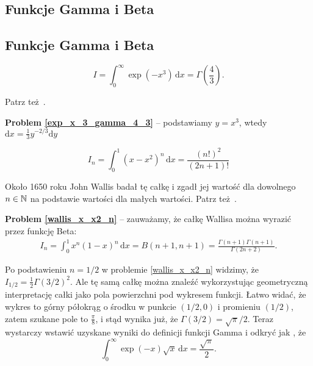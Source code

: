 \subsection{Funkcje Gamma i Beta}
\subsection{Funkcje Gamma i Beta}
\begin{problem}
\label{exp_x_3_gamma_4_3}%
    \begin{equation}
        I = \int_{0}^\infty \exp \left( -x^3 \right) \,\mathrm{d} x = \Gamma \left( \frac 4 3 \right).
    \end{equation}
\end{problem}

Patrz też \cite[s. 119]{nahin15}.

\textbf{Problem \ref{exp_x_3_gamma_4_3}} -- podstawiamy $y = x^3$, wtedy $\mathrm{d}x = \frac 1 3 y^{-2/3} \mathrm{d}y$

\begin{problem}
\label{wallis_x_x2_n}%
    \begin{equation}
        I_n = \int_{0}^1 (x-x^2)^n \,\mathrm{d} x = \frac{(n!)^2}{(2n+1)!}
    \end{equation}
\end{problem}

Około 1650 roku John Wallis badał tę całkę i zgadł jej wartość dla dowolnego $n \in {\mathbb N}$ na podstawie wartości dla małych wartości.
Patrz też \cite[s. 119-122]{nahin15}.

\textbf{Problem \ref{wallis_x_x2_n}} -- zauważamy, że całkę Wallisa można wyrazić przez funkcję Beta:
\begin{align}
	I_n = \int_{0}^1 x^n (1-x)^n \,\mathrm{d} x = B(n+1, n+1) = \frac{\Gamma(n+1) \Gamma(n+1)}{\Gamma(2n+2)}.
\end{align}

Po podstawieniu $n = 1/2$ w problemie \ref{wallis_x_x2_n} widzimy, że $I_{1/2} = \frac 1 2 \Gamma(3/2)^2$.
Ale tę samą całkę można znaleźć wykorzystując geometryczną interpretację całki jako pola powierzchni pod wykresem funkcji.
Łatwo widać, że wykres to górny półokrąg o środku w punkcie $(1/2, 0)$ i promieniu $(1/2)$, zatem szukane pole to $\frac \pi 8$, i stąd wynika już, że $\Gamma(3/2) = \sqrt{\pi}/2$.
Teraz wystarczy wstawić uzyskane wyniki do definicji funkcji Gamma i odkryć jak \cite[s. 123]{nahin15}, że
\begin{equation}
    \int_{0}^\infty \exp(-x) \sqrt{x} \,\mathrm{d} x = \frac{\sqrt \pi}{2}.
\end{equation}

